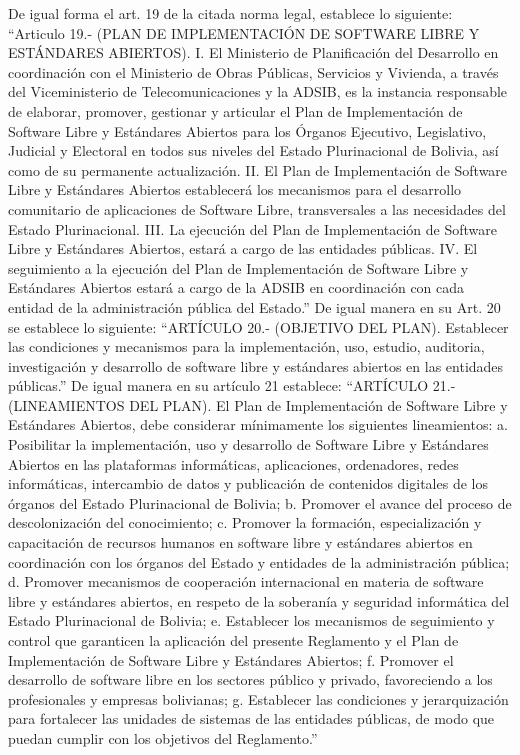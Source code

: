De igual forma el art. 19 de la citada norma legal, establece lo siguiente: “Articulo 19.- (PLAN DE IMPLEMENTACIÓN DE SOFTWARE LIBRE Y ESTÁNDARES ABIERTOS). I. El Ministerio de Planificación del Desarrollo en coordinación con el Ministerio de Obras Públicas, Servicios y Vivienda, a través del Viceministerio de Telecomunicaciones y la ADSIB, es la instancia responsable de elaborar, promover, gestionar y articular el Plan de Implementación de Software Libre y Estándares Abiertos para los Órganos Ejecutivo, Legislativo, Judicial y Electoral en todos sus niveles del Estado Plurinacional de Bolivia, así como de su permanente actualización. II. El Plan de Implementación de Software Libre y Estándares Abiertos establecerá los mecanismos para el desarrollo comunitario de aplicaciones de Software Libre, transversales a las necesidades del Estado Plurinacional. III. La ejecución del Plan de Implementación de Software Libre y Estándares Abiertos, estará a cargo de las entidades públicas. IV. El seguimiento a la ejecución del Plan de Implementación de Software Libre y Estándares Abiertos estará a cargo de la ADSIB en coordinación con cada entidad de la administración pública del Estado.” De igual manera en su Art. 20 se establece lo siguiente: “ARTÍCULO 20.- (OBJETIVO DEL PLAN). Establecer las condiciones y mecanismos para la implementación, uso, estudio, auditoria, investigación y desarrollo de software libre y estándares abiertos en las entidades públicas.”  De igual manera en su artículo 21 establece: “ARTÍCULO 21.- (LINEAMIENTOS DEL PLAN). El Plan de Implementación de Software Libre y Estándares Abiertos, debe considerar mínimamente los siguientes lineamientos: a. Posibilitar la implementación, uso y desarrollo de Software Libre y Estándares Abiertos en las plataformas informáticas, aplicaciones, ordenadores, redes informáticas, intercambio de datos y publicación de contenidos digitales de los órganos del Estado Plurinacional de Bolivia; b. Promover el avance del proceso de descolonización del conocimiento; c. Promover la formación, especialización y capacitación de recursos humanos en software libre y estándares abiertos en coordinación con los órganos del Estado y entidades de la administración pública; d. Promover mecanismos de cooperación internacional en materia de software libre y estándares abiertos, en respeto de la soberanía y seguridad informática del Estado Plurinacional de Bolivia; e. Establecer los mecanismos de seguimiento y control que garanticen la aplicación del presente Reglamento y el Plan de Implementación de Software Libre y Estándares Abiertos; f. Promover el desarrollo de software libre en los sectores público y privado, favoreciendo a los profesionales y empresas bolivianas; g. Establecer las condiciones y jerarquización para fortalecer las unidades de sistemas de las entidades públicas, de modo que puedan cumplir con los objetivos del Reglamento.” 
